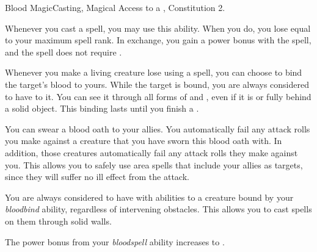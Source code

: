     \begin{magicalfeat}{Blood Magic}{Casting, Magical}
        \featpre Access to a , Constitution 2.

         Whenever you cast a spell, you may use this ability.
        When you do, you lose  equal to your maximum spell rank.
        In exchange, you gain a  power bonus with the spell, and the spell does not require .

         Whenever you make a living creature lose  using a spell, you can choose to bind the target's blood to yours.
        While the target is bound, you are always considered to have  to it.
        You can see it through all forms of  and , even if it is  or fully behind a solid object.
        This binding lasts until you finish a .

         You can swear a blood oath to your allies.
        You automatically fail any attack rolls you make against a creature that you have sworn this blood oath with.
        In addition, those creatures automatically fail any attack rolls they make against you.
        This allows you to safely use area spells that include your allies as targets, since they will suffer no ill effect from the attack.

         You are always considered to have  with \magical abilities to a creature bound by your \textit{bloodbind} ability, regardless of intervening obstacles.
        This allows you to cast spells on them through solid walls.

         The power bonus from your \textit{bloodspell} ability increases to .
    \end{magicalfeat}

